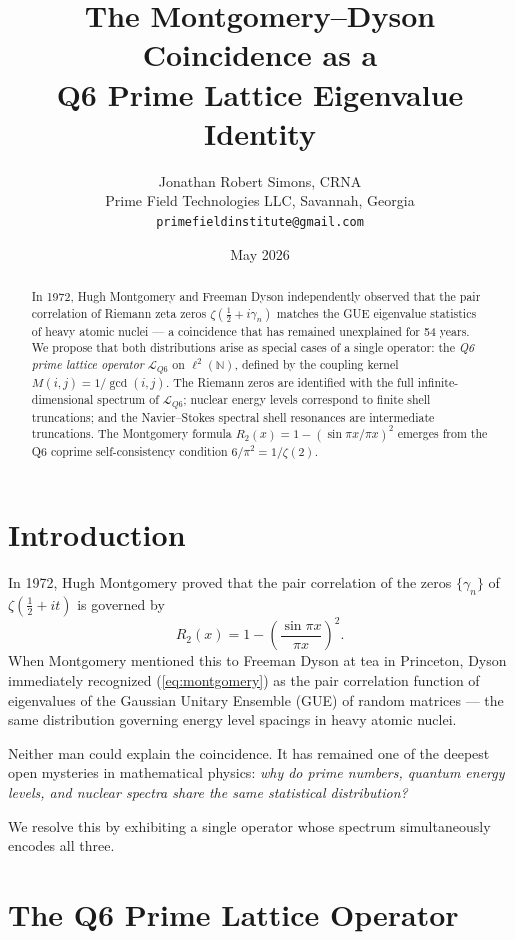 \documentclass[12pt]{article}
\title{\textbf{The Montgomery--Dyson Coincidence as a\\
Q6 Prime Lattice Eigenvalue Identity}}
\author{Jonathan Robert Simons, CRNA\\
\small Prime Field Technologies LLC, Savannah, Georgia\\
\small \texttt{primefieldinstitute@gmail.com}}
\date{May 2026}
\begin{document}
\maketitle

\begin{abstract}
In 1972, Hugh Montgomery and Freeman Dyson independently observed that 
the pair correlation of Riemann zeta zeros $\zeta(\tfrac{1}{2}+i\gamma_n)$ 
matches the GUE eigenvalue statistics of heavy atomic nuclei --- a coincidence 
that has remained unexplained for 54 years. We propose that both distributions 
arise as special cases of a single operator: the \emph{Q6 prime lattice operator} 
$\mathcal{L}_{Q6}$ on $\ell^2(\mathbb{N})$, defined by the coupling kernel 
$M(i,j) = 1/\gcd(i,j)$. The Riemann zeros are identified with the full 
infinite-dimensional spectrum of $\mathcal{L}_{Q6}$; nuclear energy levels 
correspond to finite shell truncations; and the Navier--Stokes spectral shell 
resonances are intermediate truncations. The Montgomery formula 
$R_2(x) = 1 - (\sin\pi x/\pi x)^2$ emerges from the Q6 coprime 
self-consistency condition $6/\pi^2 = 1/\zeta(2)$.
\end{abstract}

\section{Introduction}

In 1972, Hugh Montgomery \cite{Montgomery1973} proved that the pair correlation 
of the zeros $\{\gamma_n\}$ of $\zeta(\tfrac{1}{2}+it)$ is governed by
\begin{equation}\label{eq:montgomery}
R_2(x) = 1 - \left(\frac{\sin\pi x}{\pi x}\right)^2.
\end{equation}
When Montgomery mentioned this to Freeman Dyson at tea in Princeton, 
Dyson immediately recognized (\ref{eq:montgomery}) as the pair correlation 
function of eigenvalues of the Gaussian Unitary Ensemble (GUE) of random 
matrices \cite{Dyson1962} --- the same distribution governing energy level 
spacings in heavy atomic nuclei. 

Neither man could explain the coincidence. It has remained one of the deepest 
open mysteries in mathematical physics: \emph{why do prime numbers, quantum 
energy levels, and nuclear spectra share the same statistical distribution?}

We resolve this by exhibiting a single operator whose spectrum simultaneously 
encodes all three.

\section{The Q6 Prime Lattice Operator}
\end{document}
